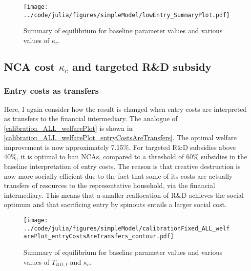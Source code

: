 \documentclass[11pt,english]{article}
\theoremstyle{definition}
\begin{document}
\begin{figure}[]
	\centering
	\texttt{[image: ../code/julia/figures/simpleModel/lowEntry\_SummaryPlot.pdf]}
	\caption{Summary of equilibrium for baseline parameter values and various values of $\kappa_c$.}
	\label{calibration_lowEntry_summaryPlot}
\end{figure}



\subsection{NCA cost $\kappa_c$ and targeted R\&D subsidy}\label{appendix:policyanalysis:allpolicies}

\subsubsection{Entry costs as transfers}

Here, I again consider how the result is changed when entry costs are interpreted as transfers to the financial intermediary. The analogue of \autoref{calibration_ALL_welfarePlot} is shown in \autoref{calibration_ALL_welfarePlot_entryCostsAreTransfers}. The optimal welfare improvement is now approximately 7.15\%. For targeted R\&D subsidies above 40\%, it is optimal to ban NCAs, compared to a threshold of 60\% subsidies in the baseline interpretation of entry costs. The reason is that creative destruction is now more socially efficient due to the fact that some of its costs are actually transfers of resources to the representative household, via the financial intermediary. This means that a smaller reallocation of R\&D achieves the social optimum and that sacrificing entry by spinouts entails a larger social cost. 

\begin{figure}[]
	\centering
	\texttt{[image: ../code/julia/figures/simpleModel/calibrationFixed\_ALL\_welfarePlot\_entryCostsAreTransfers\_contour.pdf]}
	\caption{Summary of equilibrium for baseline parameter values and various values of $T_{RD,I}$ and $\kappa_c$.}
	\label{calibration_ALL_welfarePlot_entryCostsAreTransfers}
\end{figure}
\end{document}
